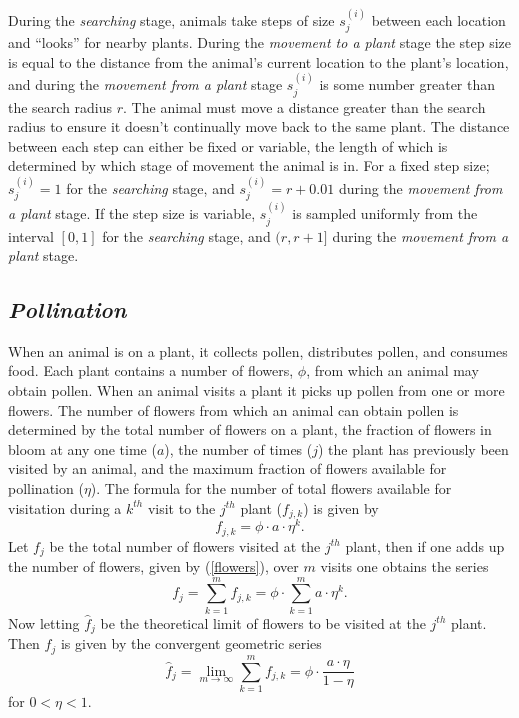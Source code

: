 \documentclass[preprint,12pt]{elsarticle}
\numberwithin{equation}{subsection}
\begin{document}
During the \emph{searching} stage, animals take steps of size
$s^{\left(i\right)}_j$ between each location and ``looks'' for nearby plants.
During the \emph{movement to a plant} stage the step size is equal to the
distance from the animal's current location to the plant's location, and during
the \emph{movement from a plant} stage $s^{\left(i\right)}_j$ is some number
greater than the search radius $r$. The animal must move a distance greater than
the search radius to ensure it doesn't continually move back to the same plant.
The distance between each step can either be fixed or variable, the length of
which is determined by which stage of movement the animal is in. For a fixed
step size; $s^{\left(i\right)}_j = 1$ for the \emph{searching} stage, and
$s^{\left(i\right)}_j = r + 0.01$ during the \emph{movement from a plant} stage.
If the step size is variable, $s^{\left(i\right)}_j$ is sampled uniformly from
the interval $[0, 1]$ for the \emph{searching} stage, and $(r, r + 1]$ during
the \emph{movement from a plant} stage.

\subsection{\emph{Pollination}}
When an animal is on a plant, it collects pollen, distributes pollen, and
consumes food. Each plant contains a number of flowers, $\phi$, from which an
animal may obtain pollen. When an animal visits a plant it picks up pollen from
one or more flowers. The number of flowers from which an animal can obtain
pollen is determined by the total number of flowers on a plant, the fraction of
flowers in bloom at any one time ($a$), the number of times ($j$) the plant has
previously been visited by an animal, and the maximum fraction of flowers
available for pollination ($\eta$). The formula for the number of total flowers
available for visitation during a $k^{th}$ visit to the $j^{th}$ plant
($f_{j,k}$) is given by
\begin{equation}\label{flowers}
	f_{j,k} = \phi \cdot a \cdot \eta^k.
\end{equation}
Let $f_j$ be the total number of flowers visited at the $j^{th}$ plant, then if
one adds up the number of flowers, given by (\ref{flowers}), over $m$ visits one
obtains the series
\[
	f_j = \sum_{k=1}^{m} f_{j,k} = \phi \cdot \sum_{k=1}^{m} a \cdot
\eta^{k}.
\]
Now letting $\hat{f}_j$ be the theoretical limit of flowers to be visited at the
$j^{th}$ plant. Then $\hat{f}_j$ is given by the convergent geometric series
\begin{equation} \label{limit}
	\hat{f}_j = \lim_{m \to \infty} \sum_{k=1}^{m} f_{j,k} = \phi \cdot
\frac{a \cdot \eta}{1 - \eta}
\end{equation}
for $0<\eta<1$.
\end{document}

